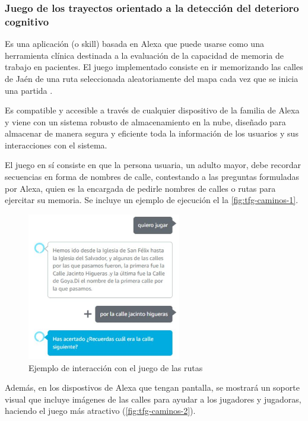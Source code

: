 \subsubsection{Juego de los trayectos orientado a la detección del deterioro cognitivo}

Es una aplicación (o skill) basada en Alexa que puede usarse como una herramienta clínica destinada a la evaluación de la capacidad de memoria de trabajo en pacientes. El juego implementado consiste en ir memorizando las calles de Jaén de una ruta seleccionada aleatoriamente del mapa cada vez que se inicia una partida \parencite{tfgAlexa3}.

Es compatible y accesible a través de cualquier dispositivo de la familia de Alexa y viene con un sistema robusto de almacenamiento en la nube, diseñado para almacenar de manera segura y eficiente toda la información de los usuarios y sus interacciones con el sistema.

El juego en sí consiste en que la persona usuaria, un adulto mayor, debe recordar secuencias en forma de nombres de calle, contestando a las preguntas formuladas por Alexa, quien es la encargada de pedirle nombres de calles o rutas para ejercitar su memoria. Se incluye un ejemplo de ejecución el la \autoref{fig:tfg-caminos-1}.

\begin{figure}[H]
	\centering
	\includegraphics[width=0.6\textwidth]{imgs/tfg-caminos-1.JPG}
	\caption{Ejemplo de interacción con el juego de las rutas}
	\label{fig:tfg-caminos-1}
\end{figure}

Además, en los dispostivos de Alexa que tengan pantalla, se mostrará un soporte visual que incluye imágenes de las calles para ayudar a los jugadores y jugadoras, haciendo el juego más atractivo (\autoref{fig:tfg-caminos-2}).

